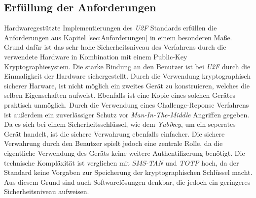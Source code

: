 \documentclass[11pt,a4paper,ngerman]{scrreprt}
\begin{document}
\subsection{Erfüllung der Anforderungen}
Hardwaregestützte Implementierungen des \textit{U2F} Standards erfüllen die Anforderungen aus Kapitel \ref{sec:Anforderungen} in einem besonderen Maße. Grund dafür ist das sehr hohe Sicherheitsniveau des Verfahrens durch die verwendete Hardware in Kombination mit einem Public-Key Kryptographiesystem. Die starke Bindung an den Benutzer ist bei \textit{U2F} durch die Einmaligkeit der Hardware sichergestellt. Durch die Verwendung kryptographisch sicherer Harware, ist nicht möglich ein zweites Gerät zu konstruieren, welches die selben Eigenschaften aufweist. Ebenfalls ist eine Kopie eines solchen Gerätes praktisch unmöglich. Durch die Verwendung eines Challenge-Reponse Verfahrens ist außerdem ein zuverlässiger Schutz vor \textit{Man-In-The-Middle} Angriffen gegeben. Da es sich bei einem Sicherheitsschlüssel, wie dem \textit{Yubikey}, um ein seperates Gerät handelt, ist die sichere Verwahrung ebenfalls einfacher. Die sichere Verwahrung durch den Benutzer spielt jedoch eine zentrale Rolle, da die eigentliche Verwendung des Geräts keine weitere Authentifizerung benötigt. Die technische Kompläxität ist verglichen mit \textit{SMS-TAN} und \textit{TOTP} hoch, da der Standard keine Vorgaben zur Speicherung der kryptographischen Schlüssel macht. Aus diesem Grund sind auch Softwarelösungen denkbar, die jedoch ein geringeres Sicherheitsniveau aufweisen.
\end{document}
